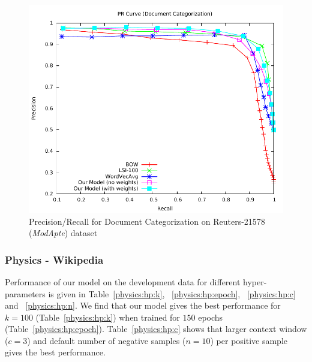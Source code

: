 \begin{figure}[tb]
\centering
        \includegraphics[width=0.7\columnwidth]{figs/pr/reuter-cs-scala.pdf}
        \vskip -4mm
    \caption{Precision/Recall for Document Categorization on Reuters-21578 (\emph{ModApte}) dataset} 
    \label{fig:pr:reuter:cs}
\end{figure}

\subsubsection{Physics - Wikipedia}
Performance of our model on the development data for different hyper-parameters is given in Table~\ref{physics:hp:k}, ~\ref{physics:hp:epoch}, ~\ref{physics:hp:c} and ~\ref{physics:hp:n}. We find that our model gives the best performance for $k=100$ (Table~\ref{physics:hp:k}) when trained for $150$ epochs (Table~\ref{physics:hp:epoch}). Table~\ref{physics:hp:c} shows that larger context window ($c = 3$) and default number of negative samples ($n = 10$) per positive sample gives the best performance. 

